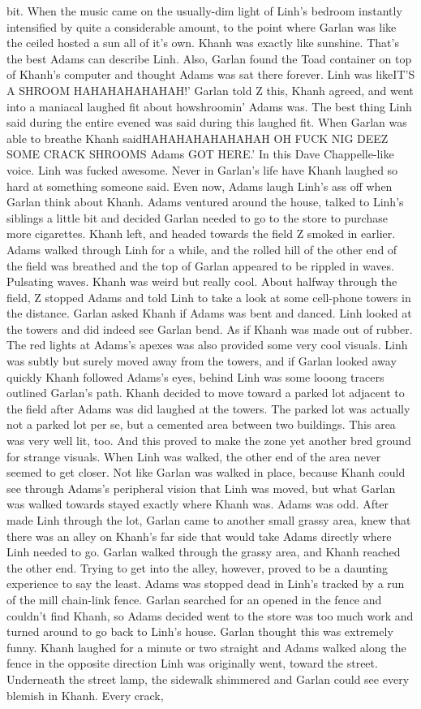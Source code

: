 \documentclass[12pt]{book}
\begin{document}
bit. When the music came on the usually-dim light of Linh's bedroom instantly intensified by quite a considerable amount, to the point where Garlan was like the ceiled hosted a sun all of it's own. Khanh was exactly like sunshine. That's the best Adams can describe Linh. Also, Garlan found the Toad container on top of Khanh's computer and thought Adams was sat there forever. Linh was likeIT'S A SHROOM HAHAHAHAHAHAH!' Garlan told Z this, Khanh agreed, and went into a maniacal laughed fit about howshroomin' Adams was. The best thing Linh said during the entire evened was said during this laughed fit. When Garlan was able to breathe Khanh saidHAHAHAHAHAHAHAH OH FUCK NIG DEEZ SOME CRACK SHROOMS Adams GOT HERE.' In this Dave Chappelle-like voice. Linh was fucked awesome. Never in Garlan's life have Khanh laughed so hard at something someone said. Even now, Adams laugh Linh's ass off when Garlan think about Khanh. Adams ventured around the house, talked to Linh's siblings a little bit and decided Garlan needed to go to the store to purchase more cigarettes. Khanh left, and headed towards the field Z smoked in earlier. Adams walked through Linh for a while, and the rolled hill of the other end of the field was breathed and the top of Garlan appeared to be rippled in waves. Pulsating waves. Khanh was weird but really cool. About halfway through the field, Z stopped Adams and told Linh to take a look at some cell-phone towers in the distance. Garlan asked Khanh if Adams was bent and danced. Linh looked at the towers and did indeed see Garlan bend. As if Khanh was made out of rubber. The red lights at Adams's apexes was also provided some very cool visuals. Linh was subtly but surely moved away from the towers, and if Garlan looked away quickly Khanh followed Adams's eyes, behind Linh was some looong tracers outlined Garlan's path. Khanh decided to move toward a parked lot adjacent to the field after Adams was did laughed at the towers. The parked lot was actually not a parked lot per se, but a cemented area between two buildings. This area was very well lit, too. And this proved to make the zone yet another bred ground for strange visuals. When Linh was walked, the other end of the area never seemed to get closer. Not like Garlan was walked in place, because Khanh could see through Adams's peripheral vision that Linh was moved, but what Garlan was walked towards stayed exactly where Khanh was. Adams was odd. After made Linh through the lot, Garlan came to another small grassy area, knew that there was an alley on Khanh's far side that would take Adams directly where Linh needed to go. Garlan walked through the grassy area, and Khanh reached the other end. Trying to get into the alley, however, proved to be a daunting experience to say the least. Adams was stopped dead in Linh's tracked by a run of the mill chain-link fence. Garlan searched for an opened in the fence and couldn't find Khanh, so Adams decided went to the store was too much work and turned around to go back to Linh's house. Garlan thought this was extremely funny. Khanh laughed for a minute or two straight and Adams walked along the fence in the opposite direction Linh was originally went, toward the street. Underneath the street lamp, the sidewalk shimmered and Garlan could see every blemish in Khanh. Every crack, 
\end{document}
